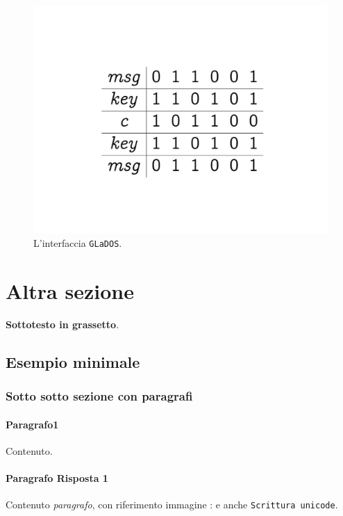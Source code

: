 \documentclass[a4paper,12pt]{report}
\begin{document}
\begin{figure}[h]
\centering{}
\includegraphics[width=\textwidth]{img/example_img.pdf}
\caption{L'interfaccia \texttt{GLaDOS}.}
\label{img:example2}
\end{figure}

\section{Altra sezione}

\textbf{Sottotesto in grassetto}.

\subsection*{Esempio minimale}

\subsubsection{Sotto sotto sezione con paragrafi}

\paragraph{Paragrafo1} Contenuto.

\paragraph{Paragrafo Risposta 1} Contenuto \textit{paragrafo}, con riferimento immagine
: e anche \texttt{Scrittura unicode}.
\end{document}
